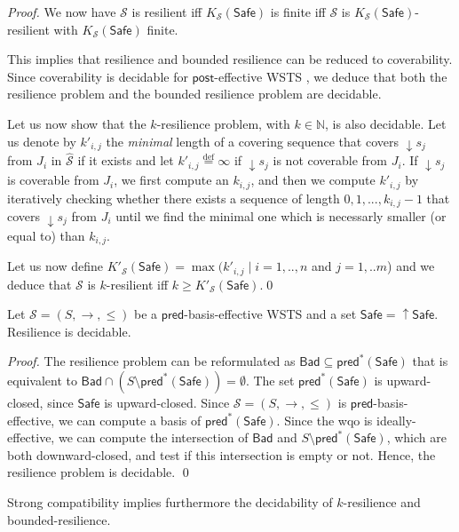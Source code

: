 \documentclass[runningheads]{llncs}
\newcommand{\alain}[1]{\todo[inline,color=red!20]{{\bf AF:} #1}}
\newcommand{\pred}{\textsf{pred}}
\newcommand{\post}{\textsf{post}}
\newcommand{\Bad}{\textsf{Bad}}
\newcommand{\Safe}{\textsf{Safe}}
\begin{document}
\begin{proof}
%
We now have $\mathscr{S}$ is resilient iff $K_{\mathscr{S}}(\Safe)$ is finite iff $\mathscr{S}$ is $K_{\mathscr{S}}(\Safe)$-resilient with $K_{\mathscr{S}}(\Safe)$ finite.

This implies that resilience and bounded resilience can be reduced to coverability.
Since coverability is decidable for $\post$-effective WSTS \cite{BFM-ic17}, we deduce that both the 
  resilience problem and the bounded resilience problem are decidable.



Let us now show that the $k$-resilience problem, with $k \in \mathbb{N}$, is also decidable.
Let us denote by $k'_{i,j}$ the \emph{minimal} length of a covering sequence that covers $\mathop{\downarrow} s_j$ from $J_i$ in $\hat{\mathscr{S}}$ if it exists and let $k'_{i,j}\stackrel{\text{def}}{=}\infty$ if $\mathop{\downarrow} s_j$ is not coverable from $J_i$. 
If $\mathop{\downarrow} s_j$ is coverable from $J_i$, we first compute an $k_{i,j}$, and then we compute $k'_{i,j}$ by iteratively checking whether there exists a sequence of length $0,1,...,k_{i,j}-1$ that covers $\mathop{\downarrow} s_j$ from $J_i$ until we find the minimal one which is necessarly smaller (or equal to) than $k_{i,j}$.

Let us now define $K'_{\mathscr{S}}(\Safe)=\max(k'_{i,j} \mid i=1,..,n$ and $j= 1,..m$) and we deduce that  $\mathscr{S}$ is $k$-resilient iff $k \geq K'_{\mathscr{S}}(\Safe)$.\qed
\end{proof} 


\begin{theorem}\label{xxx}
Let $\mathscr{S}=(S,\rightarrow, \leq)$ be a $\pred$-basis-effective WSTS and a set $\Safe = \mathop{\uparrow} \Safe$.
 {\sc Resilience} is decidable.
\end{theorem}

\begin{proof}
The resilience problem can be reformulated as 
$\Bad \subseteq  \pred^*(\Safe)$ that is equivalent to $\Bad \cap (S \setminus \pred^*(\Safe)) = \emptyset$.
The set $\pred^*(\Safe)$ is upward-closed, since $\Safe$ is upward-closed. Since $\mathscr{S}=(S,\rightarrow, \leq)$ is $\pred$-basis-effective, we can compute a basis of $\pred^*(\Safe)$.
Since the wqo is ideally-effective, we can compute the intersection of
$\Bad$
and
$S \setminus \pred^*(\Safe)$,
which are both downward-closed, and test if this intersection is empty or not. Hence, the resilience problem is decidable. \qed\end{proof} 
Strong compatibility implies furthermore the decidability
of {\sc $k$-resilience} and {\sc bounded-resilience}.
\end{document}
